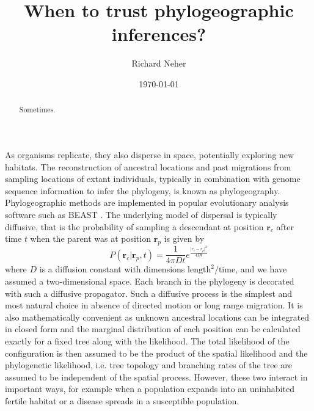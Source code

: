 \documentclass[aps,rmp, twocolumn]{revtex4}
\newcommand{\rvec}{\mathbf{r}}
\begin{document}
\title{When to trust phylogeographic inferences?}
\author{Richard Neher}
\date{\today}
\begin{abstract}
    Sometimes.
\end{abstract}

\maketitle
As organisms replicate, they also disperse in space, potentially exploring new habitats.
The reconstruction of ancestral locations and past migrations from sampling locations of extant individuals, typically in combination with genome sequence information to infer the phylogeny, is known as phylogeography.
Phylogeographic methods are implemented in popular evolutionary analysis software such as BEAST \citep{pybus_unifying_2012}.
The underlying model of dispersal is typically diffusive, that is the probability of sampling a descendant at position $\rvec_c$ after time $t$ when the parent was at position $\rvec_p$ is given by
\begin{equation}
    P(\rvec_c| \rvec_p, t) = \frac{1}{4\pi D t}e^{\frac{|r_c - r_p|^2}{4Dt}}
\end{equation}
where $D$ is a diffusion constant with dimensions $\mathrm{length}^2/\mathrm{time}$, and we have assumed a two-dimensional space.
Each branch in the phylogeny is decorated with such a diffusive propagator.
Such a diffusive process is the simplest and most natural choice in absence of directed motion or long range migration.
It is also mathematically convenient as unknown ancestral locations can be integrated in closed form and the marginal distribution of each position can be calculated exactly for a fixed tree along with the likelihood. 
The total likelihood of the configuration is then assumed to be the product of the spatial likelihood and the phylogenetic likelihood, i.e. tree topology and branching rates of the tree are assumed to be independent of the spatial process.
However, these two interact in important ways, for example when a population expands into an uninhabited fertile habitat or a disease spreads in a susceptible population.
\end{document}
